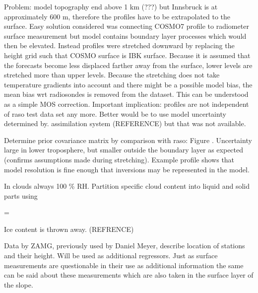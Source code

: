     Problem: model topography end above 1 km (???) but Innsbruck is at
    approximately 600 m, therefore the profiles have to be extrapolated to the
    surface. Easy solution considered was connecting COSMO7 profile to
    radiometer surface measurement but model contains boundary layer processes
    which would then be elevated. Instead profiles were stretched downward by
    replacing the height grid such that COSMO surface is IBK surface. Because
    it is assumed that the forecasts become less displaced farther away from
    the surface, lower levels are stretched more than upper levels. Because
    the stretching does not take temperature gradients into account and there
    might be a possible model bias, the mean bias wrt radiosondes is removed
    from the dataset. This can be understood as a simple MOS correction.
    Important implication: profiles are not independent of raso test data set
    any more. Better would be to use model uncertainty determined by.
    assimilation system (REFERENCE) but that was not available.

    Determine prior covariance matrix by comparison with raso: Figure
    . Uncertainty large in lower troposphere, but smaller
    outside the boundary layer as expected (confirms assumptions made during
    stretching). Example profile shows that model resolution is fine enough
    that inversions may be represented in the model.

    In clouds always 100 \% RH. Partition specific cloud content into liquid
    and solid parts using

    \startformula
        \QLIQ = \QCLOUD \startcases
              \KELVIN \le \TEMP \NR
            \NC \frac{\TEMP - 233.15 \KELVIN}{40 \KELVIN}
                 \KELVIN \lt \TEMP {} \KELVIN \NR
              \KELVIN \le \TEMP \NR
        \stopcases
    \stopformula

    Ice content is thrown away. (REFRENCE)

            {}

\stopsection


\startsection[title={Nordkette Slope Measurements}]

    Data by ZAMG, previously used by Daniel Meyer, describe location of
    stations and their height. Will be used as additional regressors.
    Just as surface measurements are questionable in their use as additional
    information the same can be said about these measurements which are also
    taken in the surface layer of the slope.

\stopsection

